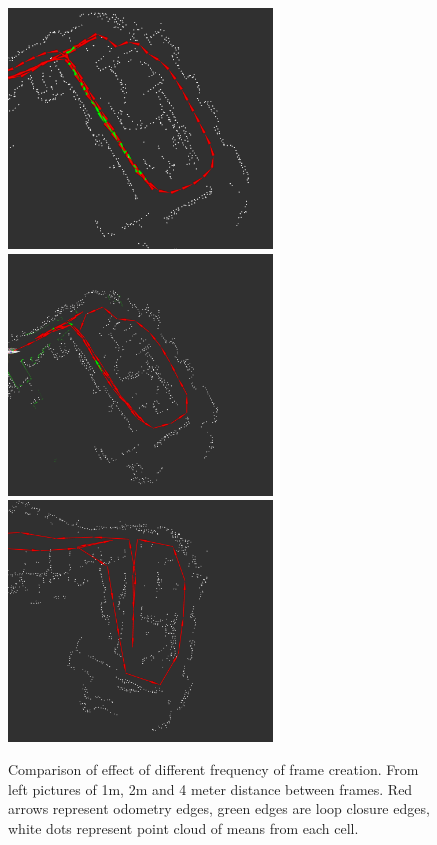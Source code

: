 \begin{figure}
	\centering
	\includegraphics[width=70mm]{../img/gen_len1.png}
		\vspace{0.1cm}
	\includegraphics[width=70mm]{../img/gen_len2.png}
	\includegraphics[width=70mm]{../img/gen_len4.png}
	\caption{Comparison of effect of different frequency of frame creation. From left pictures of 1m, 2m and 4 meter distance between frames. Red arrows represent odometry edges, green edges are loop closure edges, white dots represent point cloud of means from each cell.}\label{fig:frame_freq}
\end{figure}
